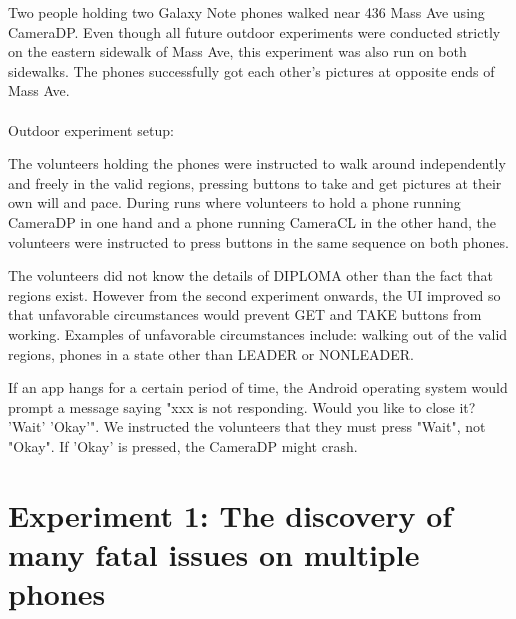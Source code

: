 Two people holding two Galaxy Note phones walked near 436 Mass Ave using CameraDP. Even though all future outdoor experiments were conducted strictly on the eastern sidewalk of Mass Ave, this experiment was also run on both sidewalks. The phones successfully got each other's pictures at opposite ends of Mass Ave.
\\
\\
Outdoor experiment setup:

The volunteers holding the phones were instructed to walk around independently and freely in the valid regions, pressing buttons to take and get pictures at their own will and pace. During runs where volunteers to hold a phone running CameraDP in one hand and a phone running CameraCL in the other hand, the volunteers were instructed to press buttons in the same sequence on both phones.

The volunteers did not know the details of DIPLOMA other than the fact that regions exist. However from the second experiment onwards, the UI improved so that unfavorable circumstances would prevent GET and TAKE buttons from working. Examples of unfavorable circumstances include: walking out of the valid regions, phones in a state other than LEADER or NONLEADER.

If an app hangs for a certain period of time, the Android operating system would prompt a message saying "xxx is not responding. Would you like to close it? 'Wait' 'Okay'". We instructed the volunteers that they must press "Wait", not "Okay". If 'Okay' is pressed, the CameraDP might crash.

\section{Experiment 1: The discovery of many fatal issues on multiple phones}

